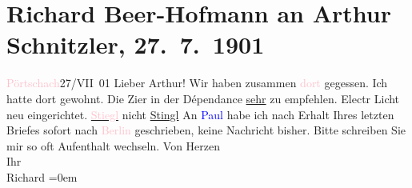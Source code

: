 

               \section[Richard Beer-Hofmann an Arthur Schnitzler, 27. 7. 1901]{ Richard Beer-Hofmann an Arthur Schnitzler, 27. 7. 1901}\nopagebreak{}\rehead{ }\normalsize\beginnumbering{} \toendnotes[C]{\smallbreak\pagebreak[2]} 
\toendnotes[C]{\smallbreak}\pstart
           \raggedleft{}{\pb}\textcolor{pink}{Pörtschach}{}\ledrightnote{\textcolor{pink}{Pörtschach}}{ }27/VII 01\pend
           \pstart
           Lieber Arthur! Wir haben zusammen \textcolor{pink}{dort}{} gegessen. Ich hatte dort gewohnt. Die Zi{\geminationm}er in der Dépendance \uline{sehr} zu empfehlen. Electr Licht neu eingerichtet.\pend
           \pstart
           \uline{\textcolor{pink}{Stiegl}{}\ledrightnote{\textcolor{pink}{Hotel Stiegl}}} nicht \uline{Stingl}\pend
           \pstart
           An \textcolor{blue}{Paul}{}\ledrightnote{\textcolor{blue}{Paul Goldmann}} habe ich nach Erhalt Ihres letzten
               Briefes sofort nach \textcolor{pink}{Berlin}{}\ledrightnote{\textcolor{pink}{Berlin}} geschrieben, {\pb}keine Nachricht bisher.\pend
           \pstart
           Bitte schreiben Sie mir so oft \label{T_L01153_1v}\label{T_L01153_1h} Aufenthalt wechseln.\pend
           \pstart
           Von Herzen{\\[\baselineskip]}Ihr{\\[\baselineskip]}\spacefill\mbox{Richard}\pend
           \leftskip=0em{}\endnumbering{}  
      